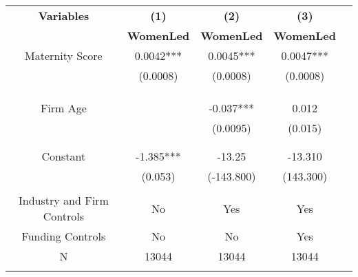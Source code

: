  \begin{table}[htbp]
 \centering
    \begin{tabular}{c c c c c}
    \toprule
    \textbf{Variables} & \textbf{(1)} & \textbf{(2)} & \textbf{(3)}                 \\ 
    \textbf & \textbf{WomenLed  } & \textbf{WomenLed } & \textbf{WomenLed }   \\ 

    \midrule
    Maternity Score      &    0.0042*** &      0.0045***  &      0.0047***   \\
                         &    (0.0008) &     (0.0008)   &   (0.0008)  \\
                         &             &                &                \\

                        &             &                &          \\
                        &             &                &           \\
    Firm Age            &             &   -0.037***   &     0.012        \\
                        &             &      (0.0095)  &   (0.015)       \\
                        &             &                &                \\
                        &             &                &               \\
Constant                &  -1.385***  &   -13.25       &    -13.310              \\
                        &   (0.053)   &  (-143.800)   &     (143.300)           \\
                        &             &                &              \\

Industry and Firm Controls   &   No        &   Yes       &       Yes    \\
    Funding Controls    &   No             &   No        &      Yes        \\

    \midrule
     N                  &   13044          &      13044  &      13044      \\          
    \bottomrule
    \addlinespace[1ex]
    \multicolumn{3}{l}{\textsuperscript{***}$P<0.01$, 
      \textsuperscript{**}$P<0.05$, 
      \textsuperscript{*}$P<0.1$}
    \end{tabular}
\end{table}
